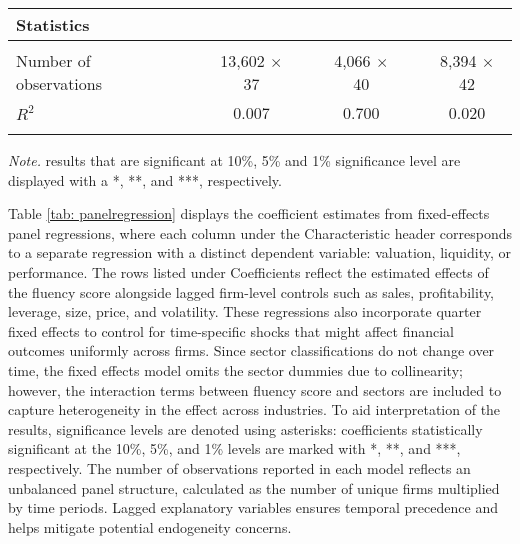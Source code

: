 \documentclass[a4paper,11pt]{report}
\begin{document}
\begin{table}[h!]
\begin{tabular}{llclllc}
\midrule
\textbf{Statistics}                       &  &                              &  & \multicolumn{1}{c}{}                        &  &                              \\ \midrule
\multicolumn{1}{l|}{}                     &  & \multicolumn{1}{l}{}         &  &                                             &  & \multicolumn{1}{l}{}   \\
\multicolumn{1}{l|}{Number of observations}      &  & 13,602 $\times$ 37                    &  & \multicolumn{1}{c}{4,066 $\times$ 40}               &  & 8,394 $\times$ 42                   \\
\multicolumn{1}{l|}{$R^2$} &  & 0.007                        &  & \multicolumn{1}{c}{0.700}                   &  & 0.020                        \\
\multicolumn{1}{l|}{}                     &  & \multicolumn{1}{l}{}         &  &                                             &  & \multicolumn{1}{l}{}         \\ \bottomrule
\end{tabular}

\vspace{0.25cm}
{%
\scriptsize \textit{Note.} results that are significant at 10\%, 5\% and 1\% significance level are displayed with a *, **, and ***, respectively. \par}
\end{table}

Table \ref{tab: panelregression} displays the coefficient estimates from fixed-effects panel regressions, where each column under the Characteristic header corresponds to a separate regression with a distinct dependent variable: valuation, liquidity, or performance. The rows listed under Coefficients reflect the estimated effects of the fluency score alongside lagged firm-level controls such as sales, profitability, leverage, size, price, and volatility. These regressions also incorporate quarter fixed effects to control for time-specific shocks that might affect financial outcomes uniformly across firms. Since sector classifications do not change over time, the fixed effects model omits the sector dummies due to collinearity; however, the interaction terms between fluency score and sectors are included to capture heterogeneity in the effect across industries. To aid interpretation of the results, significance levels are denoted using asterisks: coefficients statistically significant at the 10\%, 5\%, and 1\% levels are marked with *, **, and ***, respectively. The number of observations reported in each model reflects an unbalanced panel structure, calculated as the number of unique firms multiplied by time periods. Lagged explanatory variables ensures temporal precedence and helps mitigate potential endogeneity concerns. 
\end{document}
